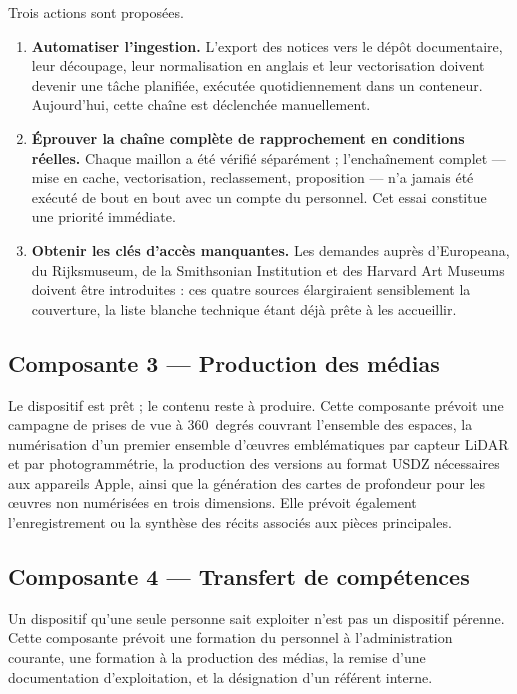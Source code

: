 Trois actions sont proposées.

\begin{enumerate}
  \item \textbf{Automatiser l'ingestion.} L'export des notices vers le dépôt
        documentaire, leur découpage, leur normalisation en anglais et leur
        vectorisation doivent devenir une tâche planifiée, exécutée
        quotidiennement dans un conteneur. Aujourd'hui, cette chaîne est
        déclenchée manuellement.

  \item \textbf{Éprouver la chaîne complète de rapprochement en conditions
        réelles.} Chaque maillon a été vérifié séparément ; l'enchaînement
        complet — mise en cache, vectorisation, reclassement, proposition —
        n'a jamais été exécuté de bout en bout avec un compte du personnel. Cet
        essai constitue une priorité immédiate.

  \item \textbf{Obtenir les clés d'accès manquantes.} Les demandes auprès
        d'Europeana, du Rijksmuseum, de la Smithsonian Institution et des
        Harvard Art Museums doivent être introduites : ces quatre sources
        élargiraient sensiblement la couverture, la liste blanche technique
        étant déjà prête à les accueillir.
\end{enumerate}

\subsection{Composante 3 — Production des médias}

Le dispositif est prêt ; le contenu reste à produire. Cette composante prévoit
une campagne de prises de vue à 360~degrés couvrant l'ensemble des espaces, la
numérisation d'un premier ensemble d'œuvres emblématiques par capteur LiDAR et
par photogrammétrie, la production des versions au format USDZ nécessaires aux
appareils Apple, ainsi que la génération des cartes de profondeur pour les
œuvres non numérisées en trois dimensions. Elle prévoit également
l'enregistrement ou la synthèse des récits associés aux pièces principales.

\subsection{Composante 4 — Transfert de compétences}

Un dispositif qu'une seule personne sait exploiter n'est pas un dispositif
pérenne. Cette composante prévoit une formation du personnel à l'administration
courante, une formation à la production des médias, la remise d'une
documentation d'exploitation, et la désignation d'un référent interne.

